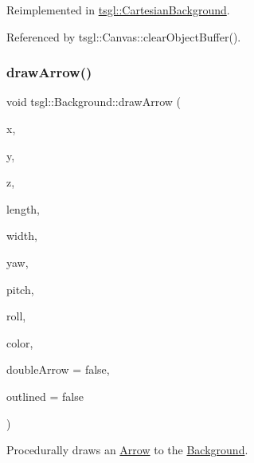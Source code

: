 Reimplemented in \hyperlink{classtsgl_1_1_cartesian_background_a4cdb6866a066e6647af9dbdae738b9b2}{tsgl\+::\+Cartesian\+Background}.



Referenced by tsgl\+::\+Canvas\+::clear\+Object\+Buffer().

\mbox{\label{classtsgl_1_1_background_af25348ef85f3b242e754a5aaae497b77}} 
\subsubsection{\texorpdfstring{draw\+Arrow()}{drawArrow()}\hspace{0.1cm}{\footnotesize\ttfamily [1/2]}}
{\footnotesize\ttfamily void tsgl\+::\+Background\+::draw\+Arrow (\begin{DoxyParamCaption}\item[{float}]{x,  }\item[{float}]{y,  }\item[{float}]{z,  }\item[{float}]{length,  }\item[{float}]{width,  }\item[{float}]{yaw,  }\item[{float}]{pitch,  }\item[{float}]{roll,  }\item[{\hyperlink{structtsgl_1_1_color_float}{Color\+Float}}]{color,  }\item[{bool}]{double\+Arrow = {\ttfamily false},  }\item[{bool}]{outlined = {\ttfamily false} }\end{DoxyParamCaption})\hspace{0.3cm}{\ttfamily [virtual]}}



Procedurally draws an \hyperlink{classtsgl_1_1_arrow}{Arrow} to the \hyperlink{classtsgl_1_1_background}{Background}. 

